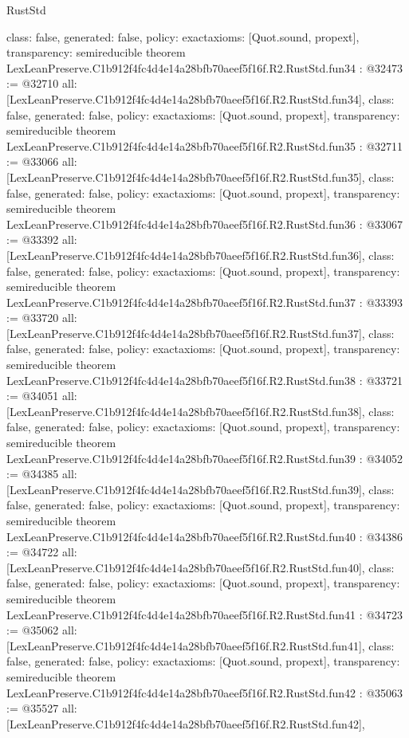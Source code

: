 \begin{lexlean}{RustStd}
\begin{coremodule}
{  class: false,
  generated: false,
  policy: exact{axioms: [Quot.sound, propext]},
  transparency: semireducible
}
theorem LexLeanPreserve.C1b912f4fc4d4e14a28bfb70aeef5f16f.R2.RustStd.fun34 : @32473 := @32710 {
  all: [LexLeanPreserve.C1b912f4fc4d4e14a28bfb70aeef5f16f.R2.RustStd.fun34],
  class: false,
  generated: false,
  policy: exact{axioms: [Quot.sound, propext]},
  transparency: semireducible
}
theorem LexLeanPreserve.C1b912f4fc4d4e14a28bfb70aeef5f16f.R2.RustStd.fun35 : @32711 := @33066 {
  all: [LexLeanPreserve.C1b912f4fc4d4e14a28bfb70aeef5f16f.R2.RustStd.fun35],
  class: false,
  generated: false,
  policy: exact{axioms: [Quot.sound, propext]},
  transparency: semireducible
}
theorem LexLeanPreserve.C1b912f4fc4d4e14a28bfb70aeef5f16f.R2.RustStd.fun36 : @33067 := @33392 {
  all: [LexLeanPreserve.C1b912f4fc4d4e14a28bfb70aeef5f16f.R2.RustStd.fun36],
  class: false,
  generated: false,
  policy: exact{axioms: [Quot.sound, propext]},
  transparency: semireducible
}
theorem LexLeanPreserve.C1b912f4fc4d4e14a28bfb70aeef5f16f.R2.RustStd.fun37 : @33393 := @33720 {
  all: [LexLeanPreserve.C1b912f4fc4d4e14a28bfb70aeef5f16f.R2.RustStd.fun37],
  class: false,
  generated: false,
  policy: exact{axioms: [Quot.sound, propext]},
  transparency: semireducible
}
theorem LexLeanPreserve.C1b912f4fc4d4e14a28bfb70aeef5f16f.R2.RustStd.fun38 : @33721 := @34051 {
  all: [LexLeanPreserve.C1b912f4fc4d4e14a28bfb70aeef5f16f.R2.RustStd.fun38],
  class: false,
  generated: false,
  policy: exact{axioms: [Quot.sound, propext]},
  transparency: semireducible
}
theorem LexLeanPreserve.C1b912f4fc4d4e14a28bfb70aeef5f16f.R2.RustStd.fun39 : @34052 := @34385 {
  all: [LexLeanPreserve.C1b912f4fc4d4e14a28bfb70aeef5f16f.R2.RustStd.fun39],
  class: false,
  generated: false,
  policy: exact{axioms: [Quot.sound, propext]},
  transparency: semireducible
}
theorem LexLeanPreserve.C1b912f4fc4d4e14a28bfb70aeef5f16f.R2.RustStd.fun40 : @34386 := @34722 {
  all: [LexLeanPreserve.C1b912f4fc4d4e14a28bfb70aeef5f16f.R2.RustStd.fun40],
  class: false,
  generated: false,
  policy: exact{axioms: [Quot.sound, propext]},
  transparency: semireducible
}
theorem LexLeanPreserve.C1b912f4fc4d4e14a28bfb70aeef5f16f.R2.RustStd.fun41 : @34723 := @35062 {
  all: [LexLeanPreserve.C1b912f4fc4d4e14a28bfb70aeef5f16f.R2.RustStd.fun41],
  class: false,
  generated: false,
  policy: exact{axioms: [Quot.sound, propext]},
  transparency: semireducible
}
theorem LexLeanPreserve.C1b912f4fc4d4e14a28bfb70aeef5f16f.R2.RustStd.fun42 : @35063 := @35527 {
  all: [LexLeanPreserve.C1b912f4fc4d4e14a28bfb70aeef5f16f.R2.RustStd.fun42],
}
\end{coremodule}
\end{lexlean}
